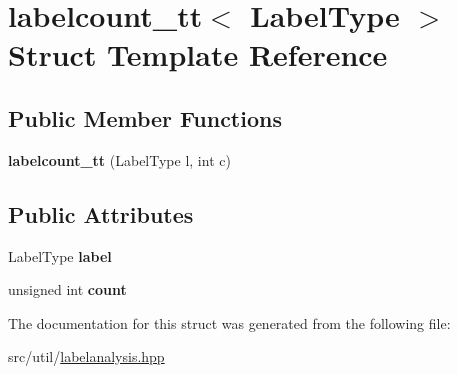 \hypertarget{structlabelcount__tt}{\section{labelcount\-\_\-tt$<$ Label\-Type $>$ Struct Template Reference}
\label{structlabelcount__tt}
}
\subsection*{Public Member Functions}
\begin{DoxyCompactItemize}
\item 
\hypertarget{structlabelcount__tt_a980e75d41d1c62332440d4fa893dea02}{{\bfseries labelcount\-\_\-tt} (Label\-Type l, int c)}\label{structlabelcount__tt_a980e75d41d1c62332440d4fa893dea02}

\end{DoxyCompactItemize}
\subsection*{Public Attributes}
\begin{DoxyCompactItemize}
\item 
\hypertarget{structlabelcount__tt_a39416df7549c38fbad4858e0f043c78c}{Label\-Type {\bfseries label}}\label{structlabelcount__tt_a39416df7549c38fbad4858e0f043c78c}

\item 
\hypertarget{structlabelcount__tt_a96a4972c318da445158d54c7db74aeac}{unsigned int {\bfseries count}}\label{structlabelcount__tt_a96a4972c318da445158d54c7db74aeac}

\end{DoxyCompactItemize}


The documentation for this struct was generated from the following file\-:\begin{DoxyCompactItemize}
\item 
src/util/\hyperlink{labelanalysis_8hpp}{labelanalysis.\-hpp}\end{DoxyCompactItemize}
